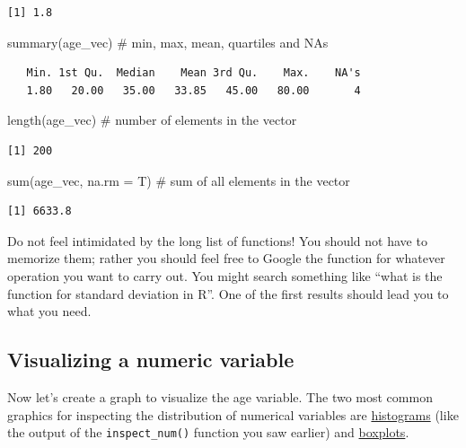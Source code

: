 \documentclass[
  letterpaper,
  DIV=11,
  numbers=noendperiod]{scrreprt}
\newenvironment{Shaded}{\begin{snugshade}}{\end{snugshade}}
\newcommand{\AttributeTok}[1]{\textcolor[rgb]{0.40,0.45,0.13}{#1}}
\newcommand{\CommentTok}[1]{\textcolor[rgb]{0.37,0.37,0.37}{#1}}
\newcommand{\FunctionTok}[1]{\textcolor[rgb]{0.28,0.35,0.67}{#1}}
\newcommand{\NormalTok}[1]{\textcolor[rgb]{0.00,0.23,0.31}{#1}}
\begin{document}
\begin{verbatim}
[1] 1.8
\end{verbatim}

\begin{Shaded}
\begin{Highlighting}[]
\FunctionTok{summary}\NormalTok{(age\_vec) }\CommentTok{\# min, max, mean, quartiles and NAs}
\end{Highlighting}
\end{Shaded}

\begin{verbatim}
   Min. 1st Qu.  Median    Mean 3rd Qu.    Max.    NA's 
   1.80   20.00   35.00   33.85   45.00   80.00       4 
\end{verbatim}

\begin{Shaded}
\begin{Highlighting}[]
\FunctionTok{length}\NormalTok{(age\_vec) }\CommentTok{\# number of elements in the vector}
\end{Highlighting}
\end{Shaded}

\begin{verbatim}
[1] 200
\end{verbatim}

\begin{Shaded}
\begin{Highlighting}[]
\FunctionTok{sum}\NormalTok{(age\_vec, }\AttributeTok{na.rm =}\NormalTok{ T) }\CommentTok{\# sum of all elements in the vector}
\end{Highlighting}
\end{Shaded}

\begin{verbatim}
[1] 6633.8
\end{verbatim}

Do not feel intimidated by the long list of functions! You should not
have to memorize them; rather you should feel free to Google the
function for whatever operation you want to carry out. You might search
something like ``what is the function for standard deviation in R''. One
of the first results should lead you to what you need.

\subsection{Visualizing a numeric
variable}\label{visualizing-a-numeric-variable}

Now let's create a graph to visualize the age variable. The two most
common graphics for inspecting the distribution of numerical variables
are \href{https://www.mathsisfun.com/data/histograms.html}{histograms}
(like the output of the \texttt{inspect\_num()} function you saw
earlier) and
\href{https://www.mathsisfun.com/data/quartiles.html}{boxplots}.
\end{document}

